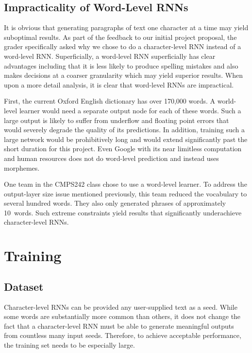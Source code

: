 \documentclass{article}
\begin{document}
\subsection{Impracticality of Word-Level RNNs}

It is obvious that generating paragraphs of text one character at a time may yield suboptimal results.  As part of the feedback to our initial project proposal, the grader specifically asked why we chose to do a character-level RNN instead of a word-level RNN.  Superficially, a word-level RNN superficially has clear advantages including that it is less likely to produce spelling mistakes and also makes decisions at a coarser granularity which may yield superior results.  When upon a more detail analysis, it is clear that word-level RNNs are impractical.

First, the current Oxford English dictionary has over 170,000 words. A world-level learner would need a separate output node for each of these words.  Such a large output is likely to suffer from underflow and floating point errors that would severely degrade the quality of its predictions.  In addition, training such a large network would be prohibitively long and would extend significantly past the short duration for this project.  Even Google with its near limitless computation and human resources does not do word-level prediction and instead uses morphemes.

One team in the CMPS242 class chose to use a word-level learner.  To address the output-layer size issue mentioned previously, this team reduced the vocabulary to several hundred words.  They also only generated phrases of approximately 10~words.  Such extreme constraints yield results that significantly underachieve character-level RNNs.


\section{Training}

\subsection{Dataset}

Character-level RNNs can be provided any user-supplied text as a seed.  While some words are substantially more common than others, it does not change the fact that a character-level RNN must be able to generate meaningful outputs from countless many input seeds. Therefore, to achieve acceptable performance, the training set needs to be especially large.
\end{document}
